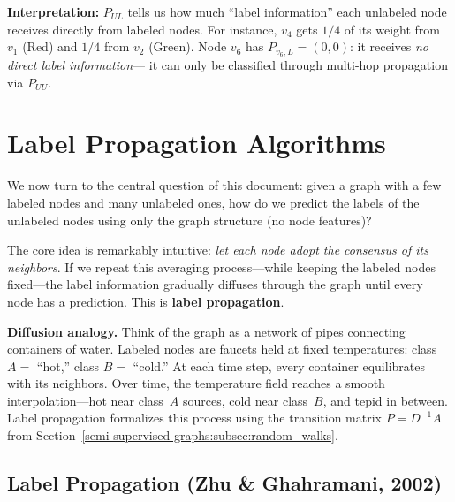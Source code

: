 \begin{notechapter}
\begin{numericalexample}[title=Label Matrix and Partitioning on a 6-Node Graph]
\textbf{Interpretation:} $P_{UL}$ tells us how much ``label information'' each
unlabeled node receives directly from labeled nodes. For instance, $v_4$ gets
$1/4$ of its weight from $v_1$ (Red) and $1/4$ from $v_2$ (Green). Node $v_6$
has $P_{v_6, L} = (0, 0)$: it receives \emph{no direct label information}---
it can only be classified through multi-hop propagation via $P_{UU}$.
\end{numericalexample}


\newpage
\section{Label Propagation Algorithms}
\label{semi-supervised-graphs:sec:lp}

We now turn to the central question of this document: given a graph with a
few labeled nodes and many unlabeled ones, how do we predict the labels of the
unlabeled nodes using only the graph structure (no node features)?

The core idea is remarkably intuitive: \emph{let each node adopt the
consensus of its neighbors}. If we repeat this averaging process---while
keeping the labeled nodes fixed---the label information gradually diffuses
through the graph until every node has a prediction. This is
\textbf{label propagation}.

\begin{insightbox}
\textbf{Diffusion analogy.} Think of the graph as a network of pipes
connecting containers of water. Labeled nodes are faucets held at fixed
temperatures: class $A =$ ``hot,'' class $B =$ ``cold.'' At each time step,
every container equilibrates with its neighbors. Over time, the temperature
field reaches a smooth interpolation---hot near class~$A$ sources, cold near
class~$B$, and tepid in between. Label propagation formalizes this process
using the transition matrix $P = D^{-1}A$ from
Section~\ref{semi-supervised-graphs:subsec:random_walks}.
\end{insightbox}

\subsection{Label Propagation (Zhu \& Ghahramani, 2002)}
\label{semi-supervised-graphs:subsec:lp_algo}


\end{notechapter}
